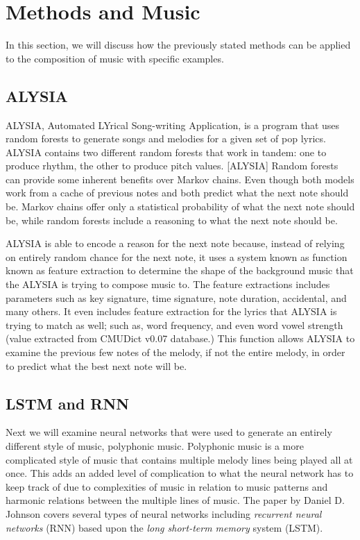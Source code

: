 \documentclass{sig-alternate}
\begin{document}
\section{Methods and Music}
	In this section, we will discuss how the previously stated methods can be applied to the composition of music with specific examples.
\subsection{ALYSIA}
\label{sec:ALYSIA}
	ALYSIA, Automated LYrical Song-writing Application, is a program that uses random forests to generate songs and melodies for a given set of pop lyrics. ALYSIA contains two different random forests that work in tandem: one to produce rhythm, the other to produce pitch values. [ALYSIA] Random forests can provide some inherent benefits over Markov chains. Even though both models work from a cache of previous notes and both predict what the next note should be. Markov chains offer only a statistical probability of what the next note should be, while random forests include a reasoning to what the next note should be.
	
	ALYSIA is able to encode a reason for the next note because, instead of relying on entirely random chance for the next note, it uses a system known as function known as feature extraction to determine the shape of the background music that the ALYSIA is trying to compose music to. The feature extractions includes parameters such as key signature, time signature, note duration, accidental, and many others. It even includes feature extraction for the lyrics that ALYSIA is trying to match as well; such as, word frequency, and even word vowel strength (value extracted from CMUDict v0.07 database.) This function allows ALYSIA to examine the previous few notes of the melody, if not the entire melody, in order to predict what the best next note will be.

\subsection{LSTM and RNN}
\label{sec:lstm}
	Next we will examine neural networks that were used to generate an entirely different style of music, polyphonic music. Polyphonic music is a more complicated style of music that contains multiple melody lines being played all at once. This adds an added level of complication to what the neural network has to keep track of due to complexities of music in relation to music patterns and harmonic relations between the multiple lines of music. The paper by Daniel D. Johnson covers several types of neural networks including \textit{recurrent neural networks} (RNN) based upon the \textit{long short-term memory} system (LSTM).
\end{document}
